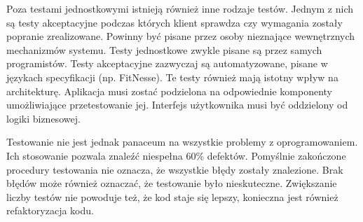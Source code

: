 Poza testami jednostkowymi istnieją również inne rodzaje testów. Jednym z nich są testy akceptacyjne podczas których klient sprawdza czy wymagania zostały popranie zrealizowane. Powinny być pisane przez osoby nieznające wewnętrznych mechanizmów systemu. Testy jednostkowe zwykle pisane są przez samych programistów. Testy akceptacyjne zazwyczaj są automatyzowane, pisane w językach specyfikacji (np. FitNesse). Te testy również mają istotny wpływ na architekturę. Aplikacja musi zostać podzielona na odpowiednie komponenty umożliwiające przetestowanie jej. Interfejs użytkownika musi być oddzielony od logiki biznesowej. 



Testowanie nie jest jednak panaceum na wszystkie problemy z oprogramowaniem. Ich stosowanie pozwala znaleźć niespełna 60\% defektów. Pomyślnie zakończone procedury testowania nie oznacza, że wszystkie błędy zostały znalezione. Brak błędów może również oznaczać, że testowanie było nieskuteczne. Zwiększanie liczby testów nie powoduje też, że kod staje się lepszy, konieczna jest również refaktoryzacja kodu.





